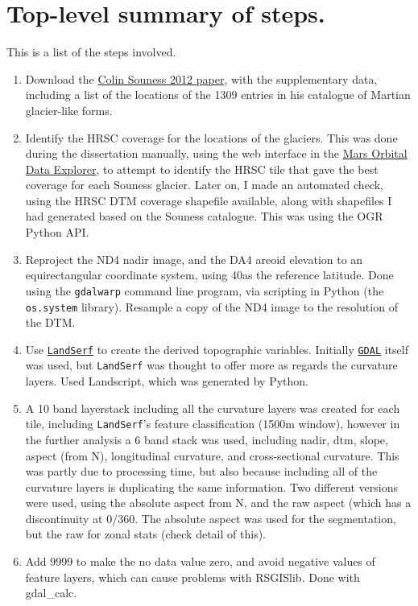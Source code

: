 \documentclass[a4paper,12pt]{article}
\begin{document}
\section{Top-level summary of steps.}
This is a list of the steps involved.
\begin{enumerate}
 \item Download the \href{http://www.sciencedirect.com/science/article/pii/S0019103511004131}{Colin Souness 2012 paper}, with the supplementary data, including
 a list of the locations of the 1309 entries in his catalogue of Martian glacier-like forms. 
 \item Identify the HRSC coverage for the locations of the glaciers. This was done during the dissertation manually, using the web 
 interface in the \href{http://ode.rsl.wustl.edu/mars/}{Mars Orbital Data Explorer}, to attempt to identify the HRSC tile that gave the best coverage
 for each Souness glacier. Later on, I made an automated check, using the HRSC DTM coverage shapefile available, along with shapefiles I had generated based on the Souness catalogue.
 This was using the OGR Python API. 
 \item Reproject the ND4 nadir image, and the DA4 areoid elevation to an equirectangular coordinate system, using
 40\textdegree  as the reference latitude. Done using the {\tt gdalwarp} command line program, via scripting in Python
 (the {\tt os.system} library). Resample a copy of the ND4 image to the resolution of the DTM.
 \item Use \href{http://www.landserf.org/}{{\tt LandSerf}} to create the derived topographic variables. Initially \href{http://gdal.org/}{{\tt GDAL}} itself was used, but
 {\tt LandSerf} was thought to offer more as regards the curvature layers. Used Landscript, which was generated by Python.
\item A 10 band layerstack including all the curvature layers was created for each tile, including {\tt LandSerf}'s feature
 classification (1500m window), however in the further analysis a 6 band stack was used, including nadir, dtm,
 slope, aspect (from N), longitudinal curvature, and cross-sectional curvature. This was partly due to processing time, but also because including all of the curvature layers is duplicating the same information. Two different versions were used,
 using the absolute aspect from N, and the raw aspect (which has a discontinuity at 0/360\textdegree.
 The absolute aspect was used for the segmentation, but the raw for zonal stats (check detail of this).
 \item Add 9999 to make the no data value zero, and avoid negative values of feature layers, which can cause problems with RSGISlib. Done with gdal\_calc.

\end{enumerate}
\end{document}
